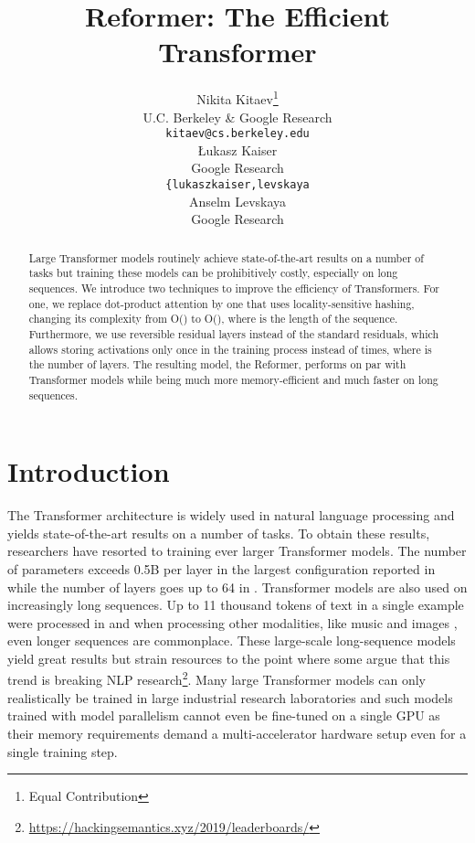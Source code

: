 \documentclass{article} \usepackage{iclr2020_conference,times}
\title{Reformer: The Efficient Transformer}
\author{Nikita Kitaev\thanks{Equal Contribution}  \\
U.C. Berkeley \& Google Research\\
\texttt{kitaev@cs.berkeley.edu} \\
\And 
\L{}ukasz Kaiser \\
Google Research\\
\texttt{\{lukaszkaiser,levskaya\rlap{\}@google.com}} \\
\And 
Anselm Levskaya \\
Google Research\\
}
\begin{document}
\maketitle

\begin{abstract}
Large Transformer models routinely achieve state-of-the-art results on
a number of tasks but training these models can be prohibitively costly,
especially on long sequences. We introduce two techniques to improve
the efficiency of Transformers. For one, we replace dot-product attention
by one that uses locality-sensitive hashing, changing its complexity
from O() to O(), where  is the length of the sequence.
Furthermore, we use reversible residual layers instead of the standard
residuals, which allows storing activations only once in the training
process instead of  times, where  is the number of layers.
The resulting model, the Reformer, performs on par with Transformer models
while being much more memory-efficient and much faster on long sequences.
\end{abstract}

\section{Introduction}

The Transformer architecture \citep{transformer} is widely used in natural language processing
and yields state-of-the-art results on a number of tasks. To obtain these results,
researchers have resorted to training ever larger Transformer models. The number of parameters exceeds
0.5B per layer in the largest configuration reported in \citep{meshtf} while the number
of layers goes up to 64 in \citep{chartransformer}. Transformer models are also used on
increasingly long sequences. Up to 11 thousand tokens of text in a single example were
processed in \citep{wikipedia} and when processing other modalities, like music \citep{huang2018music}
and images \citep{parmar2018imagetransformer}, even longer sequences are commonplace.
These large-scale long-sequence models yield great results but strain resources to
the point where some argue that this trend is breaking NLP
research\footnote{\url{https://hackingsemantics.xyz/2019/leaderboards/}}.
Many large Transformer models can only realistically be trained in large
industrial research laboratories and such models trained with model parallelism
cannot even be fine-tuned on a single GPU as their memory requirements demand a 
multi-accelerator hardware setup even for a single training step.
\end{document}
